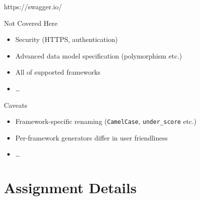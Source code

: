 \begin{frame}{https://swagger.io/}

    \begin{block}{Not Covered Here}
        \begin{itemize}
            \item Security (HTTPS, authentication)
            \item Advanced data model specification (polymorphism etc.)
            \item All of supported frameworks
            \item \ldots
        \end{itemize}
    \end{block}
    
    \begin{block}{Caveats}
        \begin{itemize}
            \item Framework-specific renaming (\texttt{CamelCase},
                \texttt{under\_score} etc.)
            \item Per-framework generators differ in user friendliness
            \item \ldots
        \end{itemize}
    \end{block}
    
\end{frame}






\section{Assignment Details}



